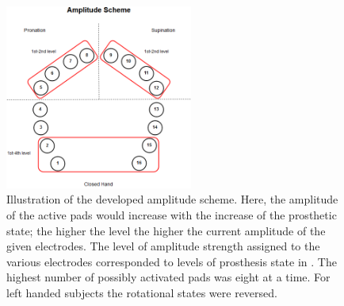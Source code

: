 \begin{figure}[H]                 
	\includegraphics[width=0.55\textwidth]{figures/El_array_amplitude}  
	\caption{Illustration of the developed amplitude scheme. Here, the amplitude of the active pads would increase with the increase of the prosthetic state; the higher the level the higher the current amplitude of the given electrodes. The level of amplitude strength assigned to the various electrodes corresponded to levels of prosthesis state in . The highest number of possibly activated pads was eight at a time. For left handed subjects the rotational states were reversed.}
	\label{fig:amplitude} 
\end{figure}






